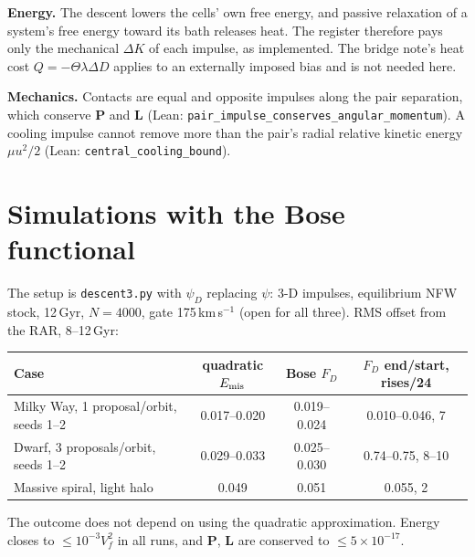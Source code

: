 \textbf{Energy.} The descent lowers the cells' own free energy, and passive relaxation of a system's free energy toward its bath releases heat. The register therefore pays only the mechanical $\Delta K$ of each impulse, as implemented. The bridge note's heat cost $Q=-\Theta\lambda\Delta D$ applies to an externally imposed bias and is not needed here.

\textbf{Mechanics.} Contacts are equal and opposite impulses along the pair separation, which conserve $\mathbf P$ and $\mathbf L$ (Lean: \texttt{pair\_impulse\_conserves\_angular\_momentum}). A cooling impulse cannot remove more than the pair's radial relative kinetic energy $\mu u^2/2$ (Lean: \texttt{central\_cooling\_bound}).

\section{Simulations with the Bose functional}
The setup is \texttt{descent3.py} with $\psi_D$ replacing $\psi$: 3-D impulses, equilibrium NFW stock, 12\,Gyr, $N=4000$, gate 175\,km\,s$^{-1}$ (open for all three). RMS offset from the RAR, 8--12\,Gyr:
\begin{center}\small
\begin{tabular}{lccc}\toprule
Case & quadratic $E_{\rm mis}$ & Bose $F_D$ & $F_D$ end/start, rises/24\\\midrule
Milky Way, 1 proposal/orbit, seeds 1--2 & 0.017--0.020 & 0.019--0.024 & 0.010--0.046, 7\\
Dwarf, 3 proposals/orbit, seeds 1--2 & 0.029--0.033 & 0.025--0.030 & 0.74--0.75, 8--10\\
Massive spiral, light halo & 0.049 & 0.051 & 0.055, 2\\\bottomrule
\end{tabular}\end{center}
The outcome does not depend on using the quadratic approximation. Energy closes to $\le10^{-3}V_f^2$ in all runs, and $\mathbf P$, $\mathbf L$ are conserved to $\le5\times10^{-17}$.

